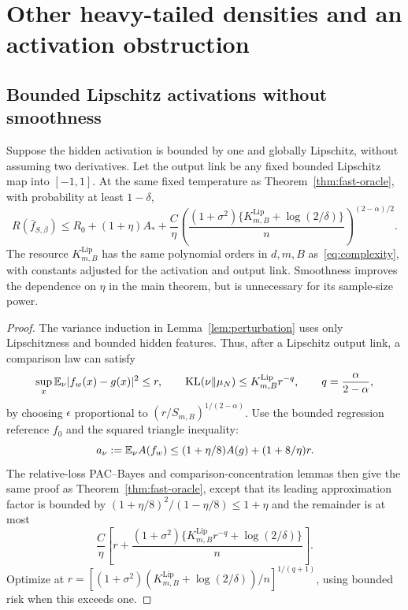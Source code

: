 \section{Other heavy-tailed densities and an activation obstruction}
\label{sec:extensions}
\subsection{Bounded Lipschitz activations without smoothness}
\begin{corollary}\label{cor:bounded-lipschitz}
Suppose the hidden activation is bounded by one and globally Lipschitz, without assuming two derivatives. Let the output link be any fixed bounded Lipschitz map into $[-1,1]$. At the same fixed temperature as Theorem~\ref{thm:fast-oracle}, with probability at least $1-\delta$,
\[
 R(\bar f_{S,\beta})\le R_0+(1+\eta)A_*
 +\frac C\eta\left(
 \frac{(1+\sigma^2)\{K^{\mathrm{Lip}}_{m,B}+\log(2/\delta)\}}n
 \right)^{(2-\alpha)/2}.
\]
The resource $K^{\mathrm{Lip}}_{m,B}$ has the same polynomial orders in $d,m,B$ as~\eqref{eq:complexity}, with constants adjusted for the activation and output link. Smoothness improves the dependence on $\eta$ in the main theorem, but is unnecessary for its sample-size power.
\end{corollary}
\begin{proof}
The variance induction in Lemma~\ref{lem:perturbation} uses only Lipschitzness and bounded hidden features. Thus, after a Lipschitz output link, a comparison law can satisfy
\[
 \sup_x\mathbb E_\nu|f_w(x)-g(x)|^2\le r,\qquad
 \operatorname{KL}(\nu\|\mu_N)\le K^{\mathrm{Lip}}_{m,B}r^{-q},
 \qquad q=\frac\alpha{2-\alpha},
\]
by choosing $\epsilon$ proportional to $(r/S_{m,B})^{1/(2-\alpha)}$.
Use the bounded regression reference $f_0$ and the squared triangle inequality:
\[
 a_\nu:=\mathbb E_\nu A(f_w)
 \le(1+\eta/8)A(g)+(1+8/\eta)r.
\]
The relative-loss PAC--Bayes and comparison-concentration lemmas then give the same proof as Theorem~\ref{thm:fast-oracle}, except that its leading approximation factor is bounded by
$(1+\eta/8)^2/(1-\eta/8)\le1+\eta$ and the remainder is at most
\[
 \frac C\eta\left[r+\frac{(1+\sigma^2)
              \{K^{\mathrm{Lip}}_{m,B}r^{-q}+\log(2/\delta)\}}n\right].
\]
Optimize at $r=[(1+\sigma^2)(K^{\mathrm{Lip}}_{m,B}+\log(2/\delta))/n]^{1/(q+1)}$, using bounded risk when this exceeds one.
\end{proof}

